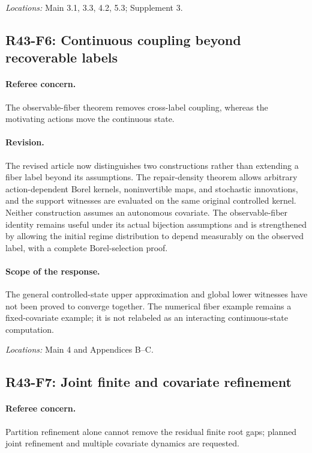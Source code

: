 \noindent\textit{Locations:} Main 3.1, 3.3, 4.2, 5.3; Supplement 3.

\subsection{R43-F6: Continuous coupling beyond recoverable labels}
\paragraph*{Referee concern.} The observable-fiber theorem removes cross-label coupling, whereas the motivating actions move the continuous state.

\paragraph*{Revision.} The revised article now distinguishes two constructions rather than extending a fiber label beyond its assumptions. The repair-density theorem allows arbitrary action-dependent Borel kernels, noninvertible maps, and stochastic innovations, and the support witnesses are evaluated on the same original controlled kernel. Neither construction assumes an autonomous covariate. The observable-fiber identity remains useful under its actual bijection assumptions and is strengthened by allowing the initial regime distribution to depend measurably on the observed label, with a complete Borel-selection proof.

\paragraph*{Scope of the response.} The general controlled-state upper approximation and global lower witnesses have not been proved to converge together. The numerical fiber example remains a fixed-covariate example; it is not relabeled as an interacting continuous-state computation.

\noindent\textit{Locations:} Main 4 and Appendices B--C.

\subsection{R43-F7: Joint finite and covariate refinement}
\paragraph*{Referee concern.} Partition refinement alone cannot remove the residual finite root gaps; planned joint refinement and multiple covariate dynamics are requested.

